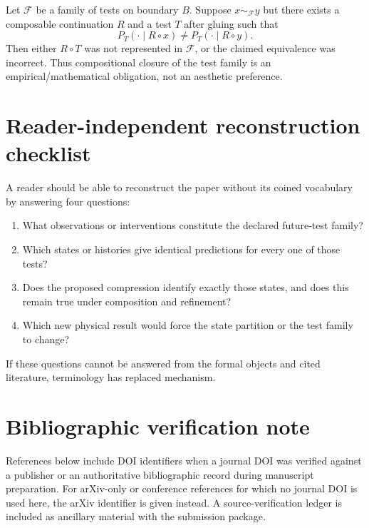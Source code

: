 \documentclass[11pt]{article}
\newcommand{\F}{\mathcal F}
\begin{document}
Let $\F$ be a family of tests on boundary $B$. Suppose $x\sim_{\F}y$ but there exists a composable continuation $R$ and a test $T$ after gluing such that
\begin{equation}
 P_T(\cdot\mid R\circ x)\neq P_T(\cdot\mid R\circ y).
\end{equation}
Then either $R\circ T$ was not represented in $\F$, or the claimed equivalence was incorrect. Thus compositional closure of the test family is an empirical/mathematical obligation, not an aesthetic preference.

\section{Reader-independent reconstruction checklist}

A reader should be able to reconstruct the paper without its coined vocabulary by answering four questions:
\begin{enumerate}
\item What observations or interventions constitute the declared future-test family?
\item Which states or histories give identical predictions for every one of those tests?
\item Does the proposed compression identify exactly those states, and does this remain true under composition and refinement?
\item Which new physical result would force the state partition or the test family to change?
\end{enumerate}
If these questions cannot be answered from the formal objects and cited literature, terminology has replaced mechanism.

\section{Bibliographic verification note}

References below include DOI identifiers when a journal DOI was verified against a publisher or an authoritative bibliographic record during manuscript preparation. For arXiv-only or conference references for which no journal DOI is used here, the arXiv identifier is given instead. A source-verification ledger is included as ancillary material with the submission package.
\end{document}

